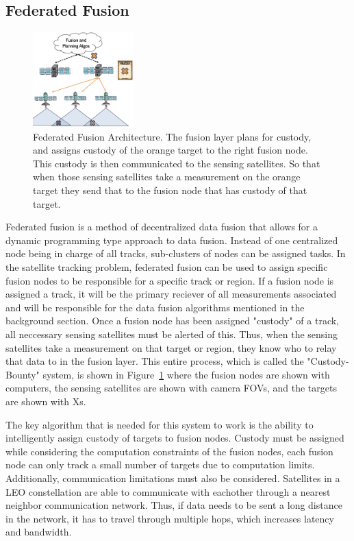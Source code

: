\subsection{Federated Fusion}


    \begin{figure}[h]
        \centering
        \includegraphics[width=0.35\textwidth]{figs/custody_bounty_sys.png}
        \caption{Federated Fusion Architecture. The fusion layer plans for custody, and assigns custody of the orange target to the right fusion node. This custody is then communicated to the sensing satellites. So that when those sensing satellites take a measurement on the orange target they send that to the fusion node that has custody of that target. }
        \label{fig:custody_bounty_sys}
    \end{figure}


    Federated fusion is a method of decentralized data fusion that allows for a dynamic programming type approach to data fusion.
    Instead of one centralized node being in charge of all tracks, sub-clusters of nodes can be assigned tasks.
    In the satellite tracking problem, federated fusion can be used to assign specific fusion nodes to be responsible for a specific track or region.
    If a fusion node is assigned a track, it will be the primary reciever of all measurements associated and will be responsible for the data fusion algorithms mentioned in the background section.
    Once a fusion node has been assigned "custody" of a track, all neccessary sensing satellites must be alerted of this. 
    Thus, when the sensing satellites take a measurement on that target or region, they know who to relay that data to in the fusion layer. 
    This entire process, which is called the "Custody-Bounty" system, is shown in Figure~\ref{fig:custody_bounty_sys} where the fusion nodes are shown with computers, the sensing satellites are shown with camera FOVs, and the targets are shown with Xs. 

    The key algorithm that is needed for this system to work is the ability to intelligently assign custody of targets to fusion nodes.
    Custody must be assigned while considering the computation constraints of the fusion nodes, each fusion node can only track a small number of targets due to computation limits.
    Additionally, communication limitations must also be considered. Satellites in a LEO constellation are able to communicate with eachother through a nearest neighbor communication network.
    Thus, if data needs to be sent a long distance in the network, it has to travel through multiple hops, which increases latency and bandwidth.
    
